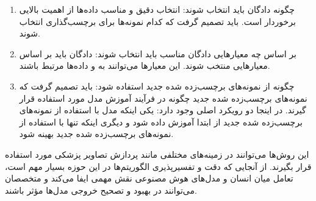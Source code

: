 \begin{enumerate}
    \item چگونه دادگان باید انتخاب شوند: انتخاب دقیق و مناسب داده‌ها از اهمیت بالایی برخوردار است. باید تصمیم گرفت که کدام نمونه‌ها برای برچسب‌گذاری انتخاب شوند.
    \item بر اساس چه معیارهایی دادگان مناسب باید انتخاب شوند: دادگان باید بر اساس معیارهایی منتخب شوند. این معیارها می‌توانند به   و  داده‌ها مرتبط باشند.
    \item چگونه از نمونه‌های برچسب‌زده شده جدید استفاده شود: باید تصمیم گرفت که نمونه‌های برچسب‌زده شده جدید چگونه در فرآیند آموزش مدل مورد استفاده قرار گیرند. در اینجا دو رویکرد اصلی وجود دارد: یکی اینکه مدل با استفاده از نمونه‌های برچسب‌زده شده جدید از ابتدا آموزش داده شود و دیگری اینکه تنها با استفاده از نمونه‌های برچسب‌زده شده جدید بهینه شود.
\end{enumerate}
این روش‌ها می‌توانند در زمینه‌های مختلفی مانند پردازش تصاویر پزشکی مورد استفاده قرار بگیرند. از آنجایی که دقت و تفسیر‌پذیری الگوریتم‌ها در این حوزه بسیار مهم است، تعامل میان انسان و مدل‌های هوش مصنوعی نقش مهمی ایفا می‌کند و متخصصان می‌توانند در بهبود و تصحیح خروجی مدل‌ها مؤثر باشند\cite{zhao2021dsal}.

